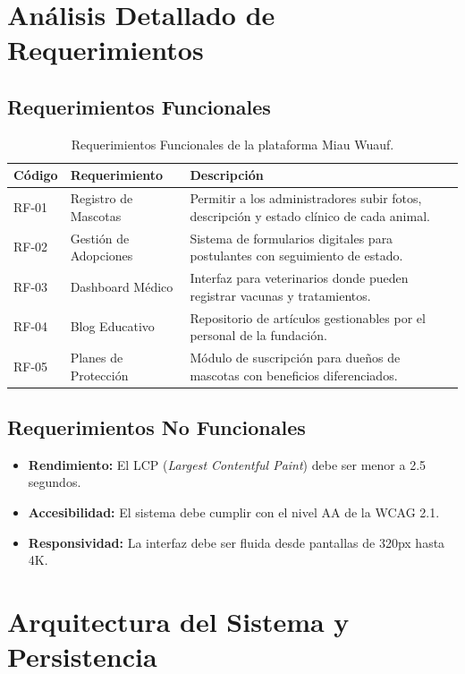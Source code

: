 \documentclass[12pt,a4paper,oneside]{report}
\begin{document}
\chapter{Análisis Detallado de Requerimientos}

\section{Requerimientos Funcionales}
\begin{longtable}{llp{9cm}}
\caption{Requerimientos Funcionales de la plataforma Miau Wuauf.} \label{tab:requerimientos} \\
\toprule
\textbf{Código} & \textbf{Requerimiento} & \textbf{Descripción} \\ \midrule
RF-01 & Registro de Mascotas & Permitir a los administradores subir fotos, descripción y estado clínico de cada animal. \\
RF-02 & Gestión de Adopciones & Sistema de formularios digitales para postulantes con seguimiento de estado. \\
RF-03 & Dashboard Médico & Interfaz para veterinarios donde pueden registrar vacunas y tratamientos. \\
RF-04 & Blog Educativo & Repositorio de artículos gestionables por el personal de la fundación. \\
RF-05 & Planes de Protección & Módulo de suscripción para dueños de mascotas con beneficios diferenciados. \\ \bottomrule
\end{longtable}

\section{Requerimientos No Funcionales}
\begin{itemize}
    \item \textbf{Rendimiento:} El LCP (\textit{Largest Contentful Paint}) debe ser menor a 2.5 segundos.
    \item \textbf{Accesibilidad:} El sistema debe cumplir con el nivel AA de la WCAG 2.1.
    \item \textbf{Responsividad:} La interfaz debe ser fluida desde pantallas de 320px hasta 4K.
\end{itemize}

\chapter{Arquitectura del Sistema y Persistencia}
\end{document}
